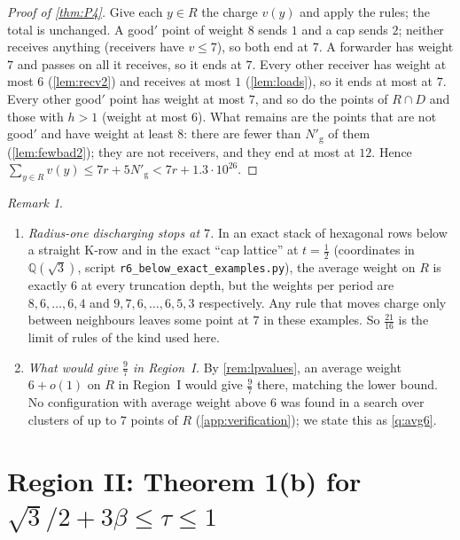 \documentclass[11pt]{amsart}
\theoremstyle{definition}
\theoremstyle{remark}
\newtheorem{remark}[theorem]{Remark}
\begin{document}
\begin{proof}[Proof of \cref{thm:P4}]
Give each $y\in R$ the charge $v(y)$ and apply the rules; the total is unchanged. A good$'$ point of weight $8$ sends $1$ and a cap sends $2$; neither receives anything (receivers have $v\le7$), so both end at $7$. A forwarder has weight $7$ and passes on all it receives, so it ends at $7$. Every other receiver has weight at most $6$ (\cref{lem:recv2}) and receives at most $1$ (\cref{lem:loads}), so it ends at most at $7$. Every other good$'$ point has weight at most $7$, and so do the points of $R\cap D$ and those with $h>1$ (weight at most $6$). What remains are the points that are not good$'$ and have weight at least $8$: there are fewer than $N'_{\mathrm g}$ of them (\cref{lem:fewbad2}); they are not receivers, and they end at most at $12$. Hence $\sum_{y\in R}v(y)\le7r+5N'_{\mathrm g}<7r+1.3\cdot10^{26}$.
\end{proof}

\begin{remark}\label{rem:P4}
\begin{enumerate}[leftmargin=2em,label=(\alph*)]
\item \emph{Radius-one discharging stops at $7$.} In an exact stack of hexagonal rows below a straight K-row and in the exact ``cap lattice'' at $t=\frac12$ (coordinates in $\mathbb Q(\sqrt3)$, script \texttt{r6\_below\_exact\_examples.py}), the average weight on $R$ is exactly $6$ at every truncation depth, but the weights per period are $8,6,\dots,6,4$ and $9,7,6,\dots,6,5,3$ respectively. Any rule that moves charge only between neighbours leaves some point at $7$ in these examples. So $\frac{21}{16}$ is the limit of rules of the kind used here.
\item \emph{What would give $\frac97$ in Region~I.} By \cref{rem:lpvalues}, an average weight $6+o(1)$ on $R$ in Region~I would give $\frac97$ there, matching the lower bound. No configuration with average weight above $6$ was found in a search over clusters of up to $7$ points of $R$ (\cref{app:verification}); we state this as \cref{q:avg6}.
\end{enumerate}
\end{remark}

\section{Region II: Theorem 1(b) for \texorpdfstring{$\sqrt3/2+3\beta\le\tau\le1$}{sqrt3/2 + 3 beta <= tau <= 1}}\label{sec:II}
\end{document}
